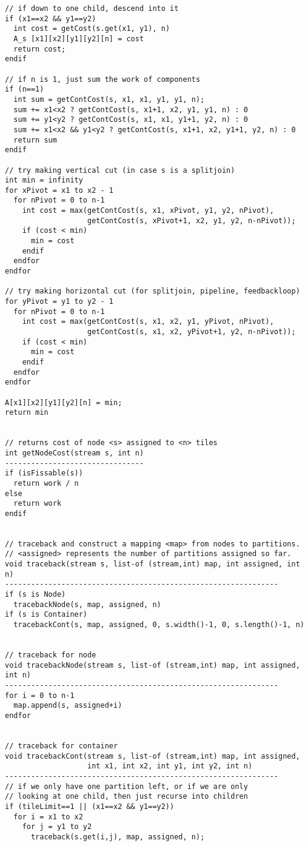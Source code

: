 \begin{verbatim}
// if down to one child, descend into it
if (x1==x2 && y1==y2)
  int cost = getCost(s.get(x1, y1), n)
  A_s [x1][x2][y1][y2][n] = cost
  return cost;
endif

// if n is 1, just sum the work of components
if (n==1)
  int sum = getContCost(s, x1, x1, y1, y1, n);
  sum += x1<x2 ? getContCost(s, x1+1, x2, y1, y1, n) : 0
  sum += y1<y2 ? getContCost(s, x1, x1, y1+1, y2, n) : 0
  sum += x1<x2 && y1<y2 ? getContCost(s, x1+1, x2, y1+1, y2, n) : 0
  return sum
endif

// try making vertical cut (in case s is a splitjoin)
int min = infinity
for xPivot = x1 to x2 - 1
  for nPivot = 0 to n-1
    int cost = max(getContCost(s, x1, xPivot, y1, y2, nPivot),
                   getContCost(s, xPivot+1, x2, y1, y2, n-nPivot));
    if (cost < min)
      min = cost
    endif
  endfor
endfor

// try making horizontal cut (for splitjoin, pipeline, feedbackloop)
for yPivot = y1 to y2 - 1
  for nPivot = 0 to n-1
    int cost = max(getContCost(s, x1, x2, y1, yPivot, nPivot),
                   getContCost(s, x1, x2, yPivot+1, y2, n-nPivot));
    if (cost < min)
      min = cost
    endif
  endfor
endfor

A[x1][x2][y1][y2][n] = min;
return min


// returns cost of node <s> assigned to <n> tiles
int getNodeCost(stream s, int n)
--------------------------------
if (isFissable(s))
  return work / n
else
  return work
endif


// traceback and construct a mapping <map> from nodes to partitions.
// <assigned> represents the number of partitions assigned so far.
void traceback(stream s, list-of (stream,int) map, int assigned, int n)
---------------------------------------------------------------
if (s is Node)
  tracebackNode(s, map, assigned, n)
if (s is Container)
  tracebackCont(s, map, assigned, 0, s.width()-1, 0, s.length()-1, n)


// traceback for node
void tracebackNode(stream s, list-of (stream,int) map, int assigned, int n)
---------------------------------------------------------------
for i = 0 to n-1
  map.append(s, assigned+i)
endfor


// traceback for container
void tracebackCont(stream s, list-of (stream,int) map, int assigned, 
                   int x1, int x2, int y1, int y2, int n)
---------------------------------------------------------------
// if we only have one partition left, or if we are only
// looking at one child, then just recurse into children
if (tileLimit==1 || (x1==x2 && y1==y2))
  for i = x1 to x2
    for j = y1 to y2
      traceback(s.get(i,j), map, assigned, n);


\end{verbatim}
